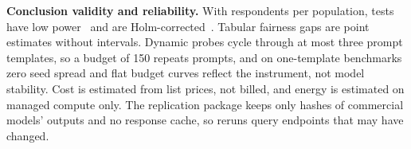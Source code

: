 \textbf{Conclusion validity and reliability.}
With  respondents per population, tests have low power~\cite{wohlin2012experimentation} and are Holm-corrected~\cite{holm1979}.
\ifarmreduced
Tabular fairness gaps are point estimates without intervals.
\fi
Dynamic probes cycle through at most three prompt templates, so a budget of 150 repeats prompts, and on one-template benchmarks zero seed spread and flat budget curves reflect the instrument, not model stability.
Cost is estimated from list prices, not billed, and energy is estimated on managed compute only.
The replication package keeps only hashes of commercial models' outputs and no response cache, so reruns query endpoints that may have changed.
